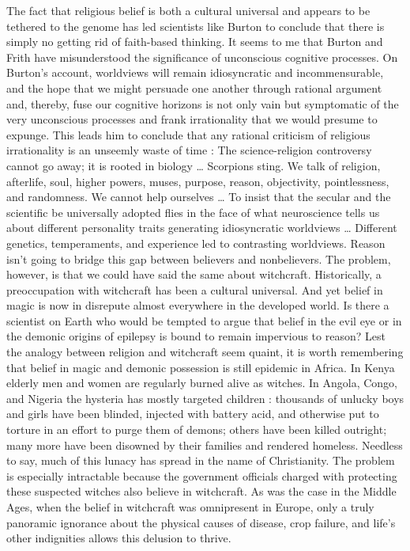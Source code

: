 \documentclass[a4paper,14pt]{extarticle}
\begin{document}
The fact that religious belief is both a cultural universal and appears to be tethered to the genome has led scientists like Burton to conclude that there is simply no getting rid of faith-based thinking.
It seems to me that Burton and Frith have misunderstood the significance of unconscious cognitive processes.
On Burton’s account, worldviews will remain idiosyncratic and incommensurable, and the hope that we might persuade one another through rational argument and, thereby, fuse our cognitive horizons is not only vain but symptomatic of the very unconscious processes and frank irrationality that we would presume to expunge.
This leads him to conclude that any rational criticism of religious irrationality is an unseemly waste of time :
The science-religion controversy cannot go away;
it is rooted in biology \dots
Scorpions sting.
We talk of religion, afterlife, soul, higher powers, muses, purpose, reason, objectivity, pointlessness, and randomness.
We cannot help ourselves \dots
To insist that the secular and the scientific be universally adopted flies in the face of what neuroscience tells us about different personality traits generating idiosyncratic worldviews \dots
Different genetics, temperaments, and experience led to contrasting worldviews.
Reason isn’t going to bridge this gap between believers and nonbelievers.
The problem, however, is that we could have said the same about witchcraft.
Historically, a preoccupation with witchcraft has been a cultural universal.
And yet belief in magic is now in disrepute almost everywhere in the developed world.
Is there a scientist on Earth who would be tempted to argue that belief in the evil eye or in the demonic origins of epilepsy is bound to remain impervious to reason?
Lest the analogy between religion and witchcraft seem quaint, it is worth remembering that belief in magic and demonic possession is still epidemic in Africa.
In Kenya elderly men and women are regularly burned alive as witches.
In Angola, Congo, and Nigeria the hysteria has mostly targeted children :
thousands of unlucky boys and girls have been blinded, injected with battery acid, and otherwise put to torture in an effort to purge them of demons;
others have been killed outright;
many more have been disowned by their families and rendered homeless.
Needless to say, much of this lunacy has spread in the name of Christianity.
The problem is especially intractable because the government officials charged with protecting these suspected witches also believe in witchcraft.
As was the case in the Middle Ages, when the belief in witchcraft was omnipresent in Europe, only a truly panoramic ignorance about the physical causes of disease, crop failure, and life’s other indignities allows this delusion to thrive.
\end{document}
